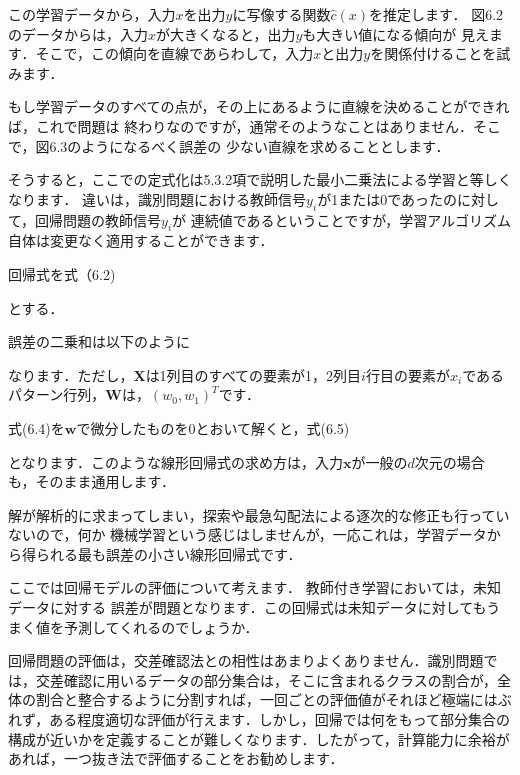 
この学習データから，入力$x$を出力$y$に写像する関数$\hat{c}(x)$を推定します．
図6.2のデータからは，入力$x$が大きくなると，出力$y$も大きい値になる傾向が
見えます．そこで，この傾向を直線であらわして，入力$x$と出力$y$を関係付けることを試みます．


もし学習データのすべての点が，その上にあるように直線を決めることができれば，これで問題は
終わりなのですが，通常そのようなことはありません．そこで，図6.3のようになるべく誤差の
少ない直線を求めることとします．


そうすると，ここでの定式化は5.3.2項で説明した最小二乗法による学習と等しくなります．
違いは，識別問題における教師信号$y_i$が1または0であったのに対して，回帰問題の教師信号$y_i$が
連続値であるということですが，学習アルゴリズム自体は変更なく適用することができます．

回帰式を式（6.2)


とする．


誤差の二乗和は以下のように


なります．ただし，$\bm{X}$は1列目のすべての要素が1，2列目$i$行目の要素が$x_i$であるパターン行列，$\bm{W}$は，$(w_0, w_1)^T$です．

式(6.4)を$\bm{w}$で微分したものを$0$とおいて解くと，式(6.5)


となります．このような線形回帰式の求め方は，入力$\bm{x}$が一般の$d$次元の場合も，そのまま通用します．

解が解析的に求まってしまい，探索や最急勾配法による逐次的な修正も行っていないので，何か
機械学習という感じはしませんが，一応これは，学習データから得られる最も誤差の小さい線形回帰式です．


ここでは回帰モデルの評価について考えます．
教師付き学習においては，未知データに対する
誤差が問題となります．この回帰式は未知データに対してもうまく値を予測してくれるのでしょうか．

回帰問題の評価は，交差確認法との相性はあまりよくありません．識別問題では，交差確認に用いるデータの部分集合は，そこに含まれるクラスの割合が，全体の割合と整合するように分割すれば，一回ごとの評価値がそれほど極端にはぶれず，ある程度適切な評価が行えます．しかし，回帰では何をもって部分集合の構成が近いかを定義することが難しくなります．したがって，計算能力に余裕があれば，一つ抜き法で評価することをお勧めします．


